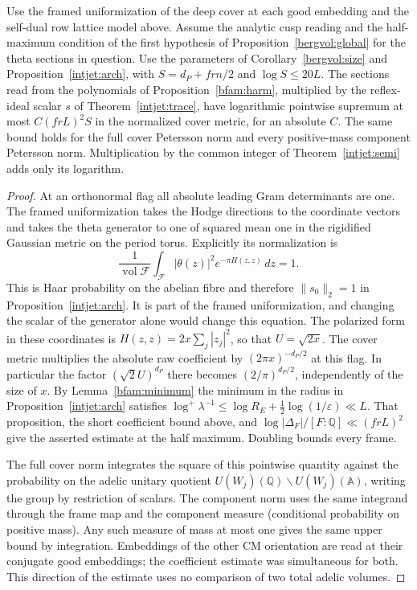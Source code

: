 \begin{corollary}
\label{bfam:metric}
Use the framed uniformization of the deep cover at each good embedding
and the self-dual row lattice model above. Assume the analytic cusp
reading and the half-maximum condition of the first hypothesis of
Proposition~\ref{bergvol:global} for the theta sections in question.
Use the parameters of Corollary~\ref{bergvol:size} and
Proposition~\ref{intjet:arch}, with \(S=d_P+frn/2\) and
\(\log S\le20L\). The sections read from the polynomials of
Proposition~\ref{bfam:harm}, multiplied by the reflex-ideal
scalar \(s\) of Theorem~\ref{intjet:trace}, have logarithmic
pointwise supremum at most \(C(frL)^2S\) in the normalized cover
metric, for an absolute \(C\). The same bound holds for the full
cover Petersson norm and every positive-mass component Petersson
norm. Multiplication by the common integer of
Theorem~\ref{intjet:semi} adds only its logarithm.
\end{corollary}
\begin{proof}
At an orthonormal flag all absolute leading Gram determinants are
one. The framed uniformization takes the Hodge directions to the
coordinate vectors and takes the theta generator to one of squared
mean one in the rigidified Gaussian metric on the period torus.
Explicitly its normalization is
\[
  \frac{1}{\operatorname{vol}\mathcal F}\int_{\mathcal F}
  |\theta(z)|^2 e^{-\pi H(z,z)}\,dz=1 .
\]
This is Haar probability on the abelian fibre and therefore
\(\|s_0\|_2=1\) in Proposition~\ref{intjet:arch}. It is part of
the framed uniformization, and changing the scalar of the
generator alone would change this equation. The polarized form
in these coordinates is \(H(z,z)=2x\sum_j|z_j|^2\), so that
\(U=\sqrt{2x}\). The cover metric multiplies the absolute raw
coefficient by \((2\pi x)^{-d_P/2}\) at this flag. In particular
the factor \((\sqrt2 U)^{d_P}\) there becomes
\((2/\pi)^{d_P/2}\), independently of the size of \(x\).
By Lemma~\ref{bfam:minimum} the minimum in the radius in
Proposition~\ref{intjet:arch} satisfies
\(\log^+\lambda^{-1}\le\log R_E+\tfrac12\log(1/\varepsilon)\ll L\).
That proposition, the short coefficient bound above, and
\(\log|\Delta_F|/[F:\mathbb Q]\ll(frL)^2\) give the asserted
estimate at the half maximum. Doubling bounds every frame.

The full cover norm integrates the square of this pointwise
quantity against the probability on the adelic unitary quotient
\(U(W_j)(\mathbb Q)\backslash U(W_j)(\mathbb A)\), writing
the group by restriction of scalars. The component norm uses the
same integrand through the frame map and the component measure
(conditional probability on positive mass). Any such measure of
mass at most one gives the same upper bound by integration.
Embeddings of the other CM orientation are read at their conjugate
good embeddings; the coefficient estimate was simultaneous for both.
This direction of the estimate uses no comparison of two total
adelic volumes.
\end{proof}
